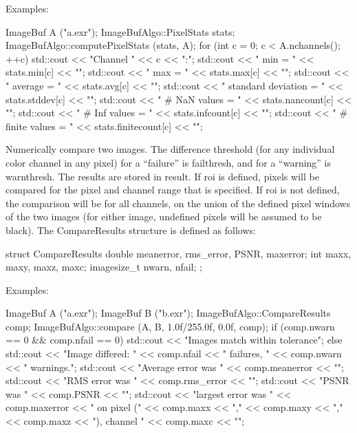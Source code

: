 \smallskip
\noindent Examples:
\begin{code}
    ImageBuf A ("a.exr");
    ImageBufAlgo::PixelStats stats;
    ImageBufAlgo::computePixelStats (stats, A);
    for (int c = 0;  c < A.nchannels();  ++c) {
        std::cout << "Channel " << c << ":\n";
        std::cout << "   min = " << stats.min[c] << "\n";
        std::cout << "   max = " << stats.max[c] << "\n";
        std::cout << "   average = " << stats.avg[c] << "\n";
        std::cout << "   standard deviation  = " << stats.stddev[c] << "\n";
        std::cout << "   # NaN values    = " << stats.nancount[c] << "\n";
        std::cout << "   # Inf values    = " << stats.infcount[c] << "\n";
        std::cout << "   # finite values = " << stats.finitecount[c] << "\n";
    }
\end{code}
\apiend

 

Numerically compare two images.  The difference threshold (for any
individual color channel in any pixel) for a ``failure'' is
{\cf failthresh}, and for a ``warning'' is {\cf warnthresh}.  The 
results are stored in {\cf result}.  If {\cf roi} is defined, pixels
will be compared for the pixel and channel range that is specified.  If
{\cf roi} is not defined, the comparison will be for all channels, on
the union of the defined pixel windows of the two images (for either
image, undefined pixels will be assumed to be black).  The 
{\cf CompareResults} structure is defined as follows:
\begin{code}
struct CompareResults {
    double meanerror, rms_error, PSNR, maxerror;
    int maxx, maxy, maxz, maxc;
    imagesize_t nwarn, nfail;
};
\end{code}

\smallskip
\noindent Examples:
\begin{code}
    ImageBuf A ("a.exr");
    ImageBuf B ("b.exr");
    ImageBufAlgo::CompareResults comp;
    ImageBufAlgo::compare (A, B, 1.0f/255.0f, 0.0f, comp);
    if (comp.nwarn == 0 && comp.nfail == 0) {
        std::cout << "Images match within tolerance\n";
    } else {
        std::cout << "Image differed: " << comp.nfail << " failures, "
                  << comp.nwarn << " warnings.\n";
        std::cout << "Average error was " << comp.meanerror << "\n";
        std::cout << "RMS error was " << comp.rms_error << "\n";
        std::cout << "PSNR was " << comp.PSNR << "\n";
        std::cout << "largest error was " << comp.maxerror 
                  << " on pixel (" << comp.maxx << "," << comp.maxy 
                  << "," << comp.maxz << "), channel " << comp.maxc << "\n";
    }
\end{code}
\apiend


